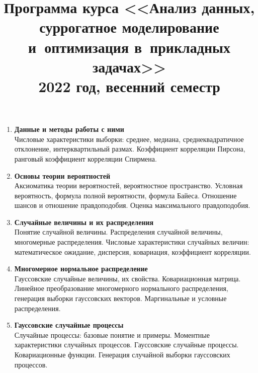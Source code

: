 \documentclass[12pt,oneside,openany]{article}
\begin{document}
\title{
  \large
  \textbf{Программа курса <<Анализ данных, суррогатное моделирование и~оптимизация в~прикладных задачах>>} \\
  2022 год, весенний семестр
}

\author{}
\date{}

\maketitle
\thispagestyle{empty}

\vspace{-10ex}


\begin{enumerate}

  \item \textbf{Данные и методы работы с ними} \\
  Числовые характеристики выборки: среднее, медиана, среднеквадратичное отклонение, интерквартильный размах. Коэффициент корреляции Пирсона, ранговый коэффициент корреляции Спирмена.

  \item \textbf{Основы теории вероятностей} \\
  Аксиоматика теории вероятностей, вероятностное пространство. Условная вероятность, формула полной вероятности, формула Байеса. Отношение шансов и отношение правдоподобия. Оценка максимального правдоподобия.

  \item \textbf{Случайные величины и их распределения} \\
  Понятие случайной величины. Распределения случайной величины, многомерные распределения. Числовые характеристики случайных величин: математическое ожидание, дисперсия, ковариация, коэффициент корреляции.

  \item \textbf{Многомерное нормальное распределение} \\
  Гауссовские случайные величины, их свойства. Ковариационная матрица. Линейное преобразование многомерного нормального распределения, генерация выборки гауссовских векторов. Маргинальные и условные распределения.

  \item \textbf{Гауссовские случайные процессы} \\
  Случайные процессы: базовые понятие и примеры. Моментные характеристики случайных процессов. Гауссовские случайные процессы. Ковариационные функции. Генерация случайной выборки гауссовских процессов.


\end{enumerate}
\end{document}
